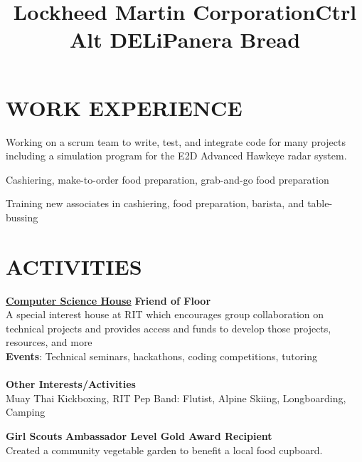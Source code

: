 \documentclass[line,margin]{res}
\begin{document}
\begin{resume}
\section{WORK EXPERIENCE}
\title{\textbf{Lockheed Martin Corporation}}
\begin{position}
    Working on a scrum team to write, test, and integrate code for many projects including a simulation program for the E2D Advanced Hawkeye radar system.
\end{position}
\title{\textbf{Ctrl Alt DELi}}
\begin{position}
    Cashiering, make-to-order food preparation, grab-and-go food preparation
\end{position}
\title{\textbf{Panera Bread}}
\begin{position}
    Training new associates in cashiering, food preparation, barista, and table-bussing
\end{position}

\section{ACTIVITIES}
\href{https://csh.rit.edu}{\textbf{Computer Science House}}
\hfill
\textbf{Friend of Floor}\\
A special interest house at RIT which encourages group collaboration on technical 
projects and provides access and funds to develop those projects, resources, and more\\
\textbf{Events}: 
Technical seminars, hackathons, coding competitions, tutoring\\
\\\textbf{Other Interests/Activities}\\
Muay Thai Kickboxing, RIT Pep Band: Flutist, Alpine Skiing, Longboarding, Camping

\textbf{Girl Scouts} \hfill \textbf{Ambassador Level Gold Award Recipient}\\
Created a community vegetable garden to benefit a local food cupboard.

\end{resume}
\end{document}
